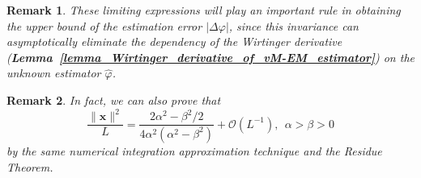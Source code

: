 \documentclass[a4paper,12pt]{article}
\newtheorem{remark}{\bf Remark}
\begin{document}
\begin{remark}
    These limiting expressions will play an important rule in obtaining the upper bound of the estimation error $|\Delta\varphi|$, since this invariance can asymptotically eliminate the dependency of the Wirtinger derivative ({\bf Lemma~\ref{lemma_Wirtinger_derivative_of_vM-EM_estimator}}) on the unknown estimator $\hat{\varphi}$. 
\end{remark}

\begin{remark}
    In fact, we can also prove that 
    \begin{equation}
        \frac{\|{\bm x}\|^2}{L} = \frac{2\alpha^2-\beta^2/2}{4\alpha^2(\alpha^2-\beta^2)} + \mathcal{O}(L^{-1}),~~\alpha>\beta>0
    \end{equation}
    by the same numerical integration approximation technique and the Residue Theorem. 
\end{remark}
\end{document}
